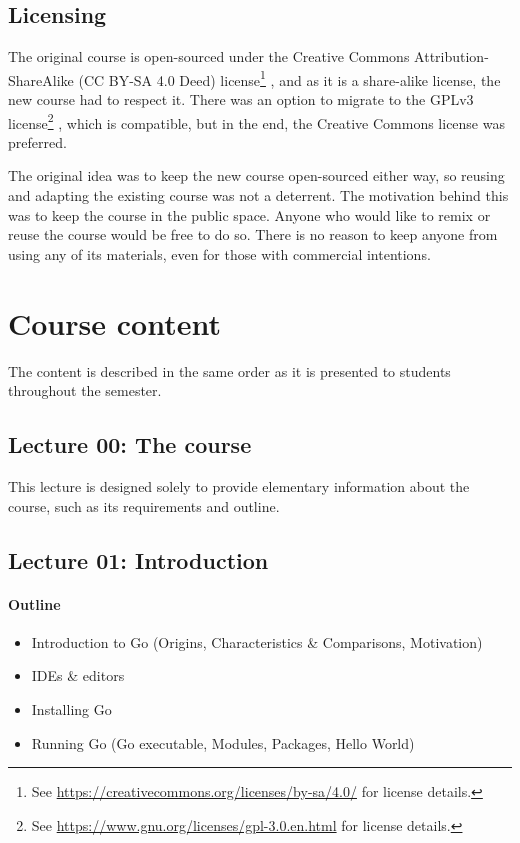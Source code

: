 \documentclass[
  digital,
  color,
  oneside,
  nosansbold,
  nocolorbold,
  lof,
  nolot,
]{fithesis4}
\begin{document}
\section{Licensing}

The original course is open-sourced under the Creative Commons Attribution-ShareAlike (CC BY-SA 4.0 Deed) license\footnote{See \url{https://creativecommons.org/licenses/by-sa/4.0/} for license details.}
, and as it is a share-alike license, the new course had to respect it. There was an option to migrate to the GPLv3 license\footnote{See \url{https://www.gnu.org/licenses/gpl-3.0.en.html} for license details.}
, which is compatible, but in the end, the Creative Commons license was preferred.

The original idea was to keep the new course open-sourced either way, so reusing and adapting the existing course was not a deterrent. The motivation behind this was to keep the course in the public space. Anyone who would like to remix or reuse the course would be free to do so. There is no reason to keep anyone from using any of its materials, even for those with commercial intentions.

\chapter{Course content}\label{chapter-content}

The content is described in the same order as it is presented to students throughout the semester.

\section{Lecture 00: The course}

This lecture is designed solely to provide elementary information about the course, such as its requirements and outline.

\section{Lecture 01: Introduction}

\subsubsection{Outline}

\begin{itemize}
    \item Introduction to Go (Origins, Characteristics \& Comparisons, Motivation)
    \item IDEs \& editors
    \item Installing Go
    \item Running Go (Go executable, Modules, Packages, Hello World)
\end{itemize}
\end{document}
